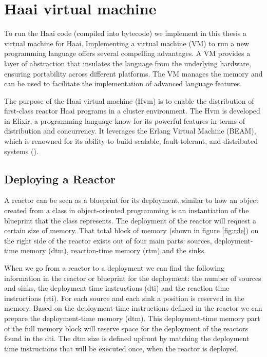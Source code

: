 \documentclass[a4paper]{book}
\begin{document}
\section{Haai virtual machine} \label{sec:Hvm}
To run the Haai code (compiled into bytecode) we implement in this thesis a virtual machine for Haai. Implementing a virtual machine (VM) to run a new programming language offers several compelling advantages. A VM provides a layer of abstraction that insulates the language from the underlying hardware, ensuring portability across different platforms. The VM manages the memory and can be used to facilitate the implementation of advanced language features. 

The purpose of the Haai virtual machine (Hvm) is to enable the distribution of first-class reactor Haai programs in a cluster environment. The Hvm is developed in Elixir, a programming language know for its powerful features in terms of distribution and concurrency. It leverages the Erlang Virtual Machine (BEAM), which is renowned for its ability to build scalable, fault-tolerant, and distributed systems (\cite{10.5555/1951582}).

\subsection{Deploying a Reactor} \label{sec:dar}
A reactor can be seen as a blueprint for its deployment, similar to how an object created from a class in object-oriented programming is an instantiation of the blueprint that the class represents. The deployment of the reactor will request a certain size of memory. 
That total block of memory (shown in figure \ref{fig:rde}) on the right side of the reactor exists out of four main parts: sources, deployment-time memory (dtm), reaction-time memory (rtm) and the sinks. 

When we go from a reactor to a deployment we can find the following information in the reactor or blueprint for the deployment: the number of sources and sinks, the deployment time instructions (dti) and the reaction time instructions (rti). For each source and each sink a position is reserved in the memory. Based on the deployment-time instructions defined in the reactor we can prepare the deployment-time memory (dtm). This deployment-time memory part of the full memory block will reserve space for the deployment of the reactors found in the dti. The dtm size is defined upfront by matching the deployment time instructions that will be executed once, when the reactor is deployed. 
\end{document}
